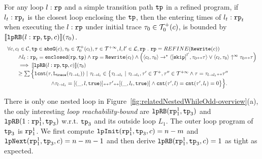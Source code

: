 \begin{lem}
  \label{lem:looprb-sound}
  For any loop $l: \mathtt{rp}$ and a simple transition path $\mathtt{tp}$ in a refined program, if $l_t: \mathtt{rp}_t$ is the closest loop enclosing the $\mathtt{tp}$, then the entering times of $l_t: \mathtt{rp}_t$ when executing the $l: \mathtt{rp}$ under initial trace $\mathtt{\tau}_0 \in \mathcal{T}^{+}_0(c)$, is bounded by $\llbracket \mathtt{lpRB}(l: \mathtt{rp}, \mathtt{tp}, c) \rrbracket(\mathtt{\tau}_0)$.
  \[
    \begin{array}{l}
    \forall c, c_l \in \cdom, \tpath \in \absG(c), \trace_0 \in \ftdom_0(c_l), \trace \in \tdom, l, l' \in \ldom, \rprog \st 
    \rprog = REFINE(\algrewrite(c))
    \\ \qquad
    \land l_t: \rprog_t = \kw{enclosed}(\rprog, \tpath)
    \land 
    \rprog = \algrewrite(c_l)
    \land
    \Big(
    \config{c_l, \trace_0} \to^* \config{\clabel{\eskip}^{l'}, \trace_0 \tracecat \trace}
    \lor \config{c_l, \trace_0} \uparrow^{\infty} \trace_0 \tracecat \trace 
    \Big)
    \\ \qquad
    \implies
    \econfig{\lpchB(l: \rprog, \tpath, c)}(\trace_0) 
    \\ \qquad \geq 
      \sum\Big\{
      \lcounter(\trace, \tracel(\trace_{l \to l_t})) ~\vert~ \trace_{l \to l_t} \in 
      \big\{\trace_{l \to l_t} ~\vert~ 
      \trace_{l \to l_t}, \trace' \in \ftdom, \trace'' \in \tdom
      \land \trace = \trace_{l \to l_t} \tracecat \trace''
      \\ \qquad \qquad \qquad \qquad
      \land \trace_{l \to l_t} = [(\_, l, \etrue)] \tracecat \trace' \tracecat [(\_, l_t, \etrue)]
      \land \counter(\trace', l) = \counter(\trace', l_t) = 0 
      \big\}
      \Big\}.
\end{array}
  \]
\end{lem}

There is only one nested loop in Figure~\ref{fig:relatedNestedWhileOdd-overview}(a),
the only interesting \emph{loop reachability-bound} are $\mathtt{lpRB}(\mathtt{rp}_1^1, \mathtt{tp}_3)$ and $\mathtt{lpRB}(1: \mathtt{rp}_1^1, \mathtt{tp}_3)$ 
w.r.t. $\mathtt{tp}_3$ and its outside loop $L_1$.
The outer loop program of $\mathtt{tp}_3$ is $\mathtt{rp}_1^1$.
We first compute $\mathtt{lpInit}(\mathtt{rp}_1^1, \mathtt{tp}_3, c) = n - m $ and $\mathtt{lpNext}(\mathtt{rp}_1^1, \mathtt{tp}_3, c) = n - m - 1$ and then derive $\mathtt{lpRB}(\mathtt{rp}_1^1, \mathtt{tp}_3, c) = 1$ as tight as expected.

